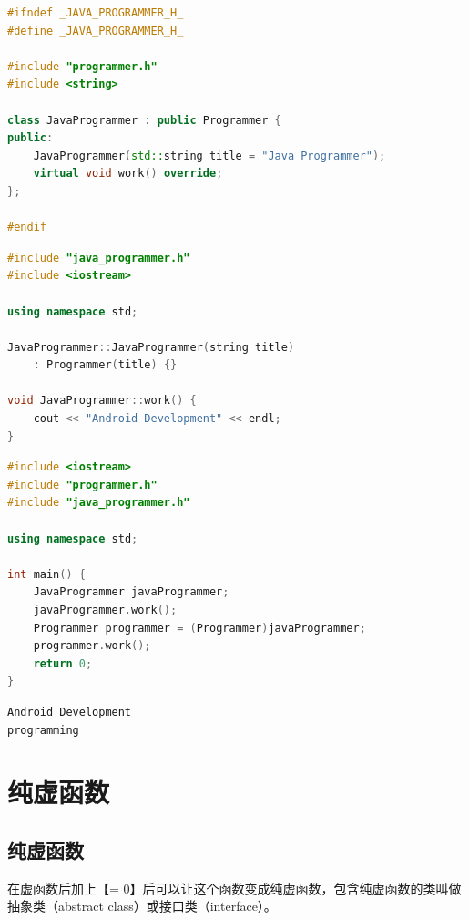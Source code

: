 \begin{lstlisting}[language=C++, title=java\_programmer.h]
#ifndef _JAVA_PROGRAMMER_H_
#define _JAVA_PROGRAMMER_H_

#include "programmer.h"
#include <string>

class JavaProgrammer : public Programmer {
public:
	JavaProgrammer(std::string title = "Java Programmer");
	virtual void work() override;
};

#endif
\end{lstlisting}

\begin{lstlisting}[language=C++, title=java\_programmer.cpp]
#include "java_programmer.h"
#include <iostream>

using namespace std;

JavaProgrammer::JavaProgrammer(string title) 
	: Programmer(title) {}

void JavaProgrammer::work() {
	cout << "Android Development" << endl;
}
\end{lstlisting}

\begin{lstlisting}[language=C++, title=test\_programmer.cpp]
#include <iostream>
#include "programmer.h"
#include "java_programmer.h"

using namespace std;

int main() {
	JavaProgrammer javaProgrammer;
	javaProgrammer.work();
	Programmer programmer = (Programmer)javaProgrammer;
	programmer.work();
	return 0;
}
\end{lstlisting}

\begin{tcolorbox}
	\begin{verbatim}
Android Development
programming
	\end{verbatim}
\end{tcolorbox}

\newpage

\section{纯虚函数}

\subsection{纯虚函数}

在虚函数后加上【= 0】后可以让这个函数变成纯虚函数，包含纯虚函数的类叫做抽象类（abstract class）或接口类（interface）。 \\

